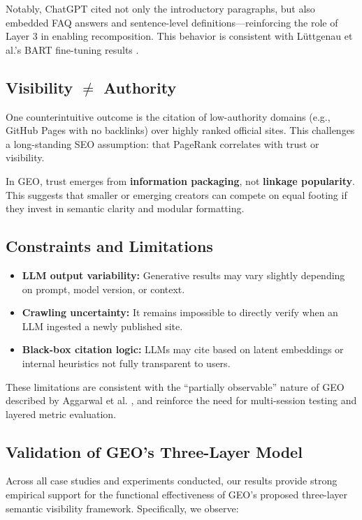 Notably, ChatGPT cited not only the introductory paragraphs, but also embedded FAQ answers and sentence-level definitions---reinforcing the role of Layer 3 in enabling recomposition. This behavior is consistent with Lüttgenau et al.’s BART fine-tuning results \cite{luttgenau2025beyondseo}.

\subsection{Visibility \texorpdfstring{$\neq$}{≠} Authority}


One counterintuitive outcome is the citation of low-authority domains (e.g., GitHub Pages with no backlinks) over highly ranked official sites. This challenges a long-standing SEO assumption: that PageRank correlates with trust or visibility.

In GEO, trust emerges from \textbf{information packaging}, not \textbf{linkage popularity}. This suggests that smaller or emerging creators can compete on equal footing if they invest in semantic clarity and modular formatting.

\subsection{Constraints and Limitations}

\begin{itemize}
  \item \textbf{LLM output variability:} Generative results may vary slightly depending on prompt, model version, or context.
  \item \textbf{Crawling uncertainty:} It remains impossible to directly verify when an LLM ingested a newly published site.
  \item \textbf{Black-box citation logic:} LLMs may cite based on latent embeddings or internal heuristics not fully transparent to users.
\end{itemize}

These limitations are consistent with the “partially observable” nature of GEO described by Aggarwal et al. \cite{aggarwal2024geo}, and reinforce the need for multi-session testing and layered metric evaluation.

\subsection{Validation of GEO's Three-Layer Model}

Across all case studies and experiments conducted, our results provide strong empirical support for the functional effectiveness of GEO’s proposed three-layer semantic visibility framework. Specifically, we observe:

